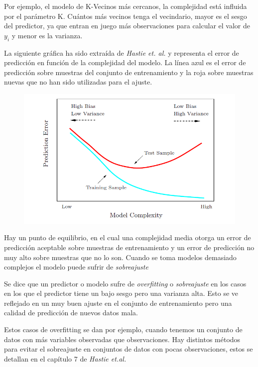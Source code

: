 \noindent Por ejemplo, el modelo de K-Vecinos más cercanos, la complejidad está influida por el parámetro K. Cuántos más vecinos tenga el vecindario, mayor es el sesgo del predictor, ya que entran en juego más observaciones para calcular el valor de $y_i$ y menor es la varianza.  

\noindent La siguiente gráfica ha sido extraída de \textit{Hastie et. al. } \cite{Hastie 2001} y representa el error de predicción en función de la complejidad del modelo. La línea azul es el error de predicción sobre muestras del conjunto de entrenamiento y la roja sobre muestras nuevas que no han sido utilizadas para el ajuste. 

\begin{figure}[h]
\centering
\includegraphics[scale=0.45]{Documentos Extra/Imagenes/Bias-Variance-Tradeoff.png}
\end{figure}
\newpage
\noindent Hay un punto de equilibrio, en el cual una complejidad media otorga un error de predicción aceptable sobre muestras de entrenamiento y un error de predicción no muy alto sobre muestras que no lo son. Cuando se toma modelos demasiado complejos el modelo puede sufrir de \textit{sobreajuste}

\begin{defi}
Se dice que un predictor o modelo sufre de \textit{overfitting} o \textit{sobreajuste} en los casos en los que el predictor tiene un bajo sesgo pero una varianza alta. Esto se ve reflejado en un muy buen ajuste en el conjunto de entrenamiento pero una calidad de predicción de nuevos datos mala. 
\end{defi}

\noindent Estos casos de overfitting se dan por ejemplo, cuando tenemos un conjunto de datos con más variables observadas que observaciones. Hay distintos métodos para evitar el sobreajuste en conjuntos de datos con pocas observaciones, estos se detallan en el capítulo 7 de \textit{Hastie et.al.}\cite{Hastie 2001}





















